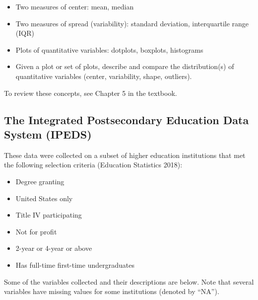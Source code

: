 \documentclass[
]{report}
\begin{document}
\begin{itemize}
\item
  Two measures of center: mean, median
\item
  Two measures of spread (variability): standard deviation, interquartile range (IQR)
\item
  Plots of quantitative variables: dotplots, boxplots, histograms
\item
  Given a plot or set of plots, describe and compare the distribution(s)
  of quantitative variables
  (center, variability, shape, outliers).
\end{itemize}

To review these concepts, see Chapter 5 in the textbook.

\subsection{The Integrated Postsecondary Education Data System (IPEDS)}\label{the-integrated-postsecondary-education-data-system-ipeds}

These data were collected on a subset of higher education institutions that met the following selection criteria (Education Statistics 2018):

\begin{itemize}
\item
  Degree granting
\item
  United States only
\item
  Title IV participating
\item
  Not for profit
\item
  2-year or 4-year or above
\item
  Has full-time first-time undergraduates
\end{itemize}

Some of the variables collected and their descriptions are below. Note that several variables have missing values for some institutions (denoted by ``NA'').
\end{document}

